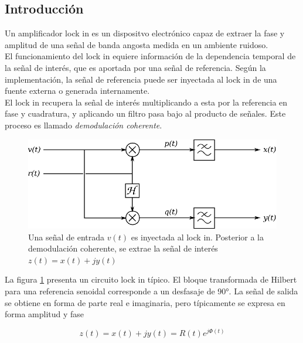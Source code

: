 \documentclass[11pt,a4paper]{extarticle}
\begin{document}
\begin{multicols}{2}
\section{Introducción}

Un amplificador lock in es un dispositvo electrónico capaz de extraer la fase y amplitud de una señal de banda angosta medida en un ambiente ruidoso.\\

El funcionamiento del lock in equiere información de la dependencia temporal de la señal de interés, que es aportada por una señal de referencia. Según la implementación, la señal de referencia puede ser inyectada al lock in de una fuente externa o generada internamente.\\ 

El lock in recupera la señal de interés multiplicando a esta por la referencia en fase y cuadratura, y aplicando un filtro pasa bajo al producto de señales. Este proceso es llamado \textit{demodulación coherente}. \cite{zurich}\\

\begin{figure}[H]
	\centering
	\includegraphics[width=\linewidth]{Images/lockin_gral.eps}
	\caption{Una señal de entrada $v(t)$ es inyectada al lock in. Posterior a la demodulación coherente, se extrae la señal de interés $z(t)=x(t)+jy(t)$}
	\label{fig:lockin}
\end{figure}

La figura \ref{fig:lockin} presenta un circuito lock in típico. El bloque transformada de Hilbert para una referencia senoidal corresponde a un desfasaje de 90°. La señal de salida se obtiene en forma de parte real e imaginaria, pero típicamente se expresa en forma amplitud y fase

\begin{equation*}
	z(t) = x(t) + j y(t) = R(t) e ^{j\Phi(t)}
\end{equation*}\\[-1em]


\end{multicols}
\end{document}
